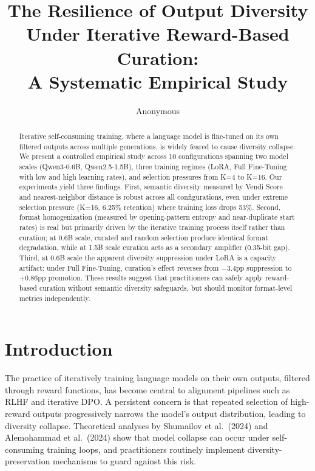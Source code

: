 \documentclass[11pt,a4paper]{article}
\title{The Resilience of Output Diversity Under Iterative Reward-Based Curation:\\A Systematic Empirical Study}
\author{Anonymous}
\date{}
\begin{document}
\maketitle

\begin{abstract}
Iterative self-consuming training, where a language model is fine-tuned on its own filtered outputs across multiple generations, is widely feared to cause diversity collapse. We present a controlled empirical study across 10 configurations spanning two model scales (Qwen3-0.6B, Qwen2.5-1.5B), three training regimes (LoRA, Full Fine-Tuning with low and high learning rates), and selection pressures from K=4 to K=16. Our experiments yield three findings. First, semantic diversity measured by Vendi Score and nearest-neighbor distance is robust across all configurations, even under extreme selection pressure (K=16, 6.25\% retention) where training loss drops 53\%. Second, format homogenization (measured by opening-pattern entropy and near-duplicate start rates) is real but primarily driven by the iterative training process itself rather than curation; at 0.6B scale, curated and random selection produce identical format degradation, while at 1.5B scale curation acts as a secondary amplifier (0.35-bit gap). Third, at 0.6B scale the apparent diversity suppression under LoRA is a capacity artifact: under Full Fine-Tuning, curation's effect reverses from $-3.4$pp suppression to $+0.86$pp promotion. These results suggest that practitioners can safely apply reward-based curation without semantic diversity safeguards, but should monitor format-level metrics independently.
\end{abstract}

\section{Introduction}

The practice of iteratively training language models on their own outputs, filtered through reward functions, has become central to alignment pipelines such as RLHF and iterative DPO. A persistent concern is that repeated selection of high-reward outputs progressively narrows the model's output distribution, leading to diversity collapse. Theoretical analyses by Shumailov et al.\ (2024) and Alemohammad et al.\ (2024) show that model collapse can occur under self-consuming training loops, and practitioners routinely implement diversity-preservation mechanisms to guard against this risk.
\end{document}
